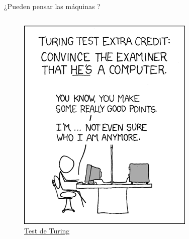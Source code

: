 \begin{frame}[fragile]{¿Pueden pensar las máquinas ?}

\begin{columns}
	\begin{column}{0.5\textwidth}
		\begin{figure}
			\centering
			
			\includegraphics[width=\textwidth]{Automatas/turing_test}
			\caption{\href{https://es.wikipedia.org/wiki/Aut\%C3\%B3mata_finito}{Test de Turing}}	
				
		\end{figure}
		
	\end{column}
	\begin{column}{0.5\textwidth}
		\pause
		\begin{figure}
			\centering
			

\end{figure}
\end{column}
\end{columns}
\end{frame}
